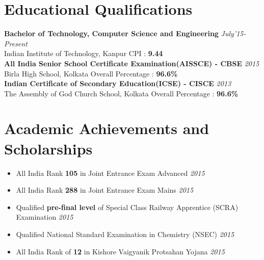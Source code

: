 \documentclass[11pt,a4paper]{moderncv}
\newcommand{\education}[5]{
  \textbf{\large{#1}} \hfill\textit{#2}\\
  #5 \hfill \large{#3 : \textbf{#4}}
}
\newcommand{\neducation}[5]{
  & #1 & #2 & &#5 & #3 : #4
}
\newcommand{\achievement}[2]{
  \item #1 \hfill \textit{#2}
}
\begin{document}
  \makecvtitle
  \section{Educational Qualifications}
    \education{Bachelor of Technology, Computer Science and Engineering}{July'15-Present}{CPI}{9.44}{Indian Institute of Technology, Kanpur}\\
    \education{All India Senior School Certificate Examination(AISSCE) - CBSE}{2015}{Overall Percentage}{96.6\%}{Birla High School, Kolkata}\\
    \education{Indian Certificate of Secondary Education(ICSE) - CISCE}{2013}{Overall Percentage}{96.6\%}{The Assembly of God Church School, Kolkata}
  \section{Academic Achievements and Scholarships}
    \begin{itemize}
      \achievement{All India Rank \textbf{105} in Joint Entrance Exam Advanced}{2015}
      \achievement{All India Rank \textbf{288} in Joint Entrance Exam Mains}{2015}
      \achievement{Qualified \textbf{pre-final level} of Special Class Railway Apprentice (SCRA) Examination}{2015}
      \achievement{Qualified National Standard Examination in Chemistry (NSEC)}{2015}
      \achievement{All India Rank of \textbf{12} in Kishore Vaigyanik Protsahan Yojana}{2015}
    \end{itemize}
\end{document}
